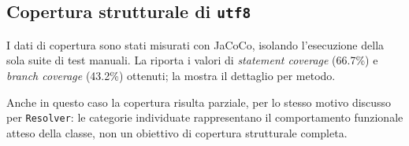 \subsection{Copertura strutturale di \texttt{utf8}}
I dati di copertura sono stati misurati con JaCoCo, isolando
l'esecuzione della sola suite di test manuali. La
 riporta i valori di \emph{statement coverage}
(66.7\%) e \emph{branch coverage} (43.2\%) ottenuti; la
 mostra il dettaglio per metodo.

Anche in questo caso la copertura risulta parziale, per lo stesso
motivo discusso per \texttt{Resolver}: le categorie individuate
rappresentano il comportamento funzionale atteso della classe, non un
obiettivo di copertura strutturale completa.